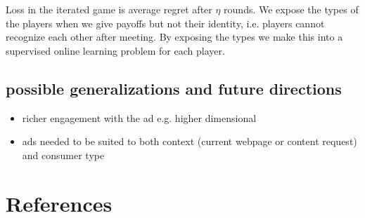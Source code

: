 \documentclass{article}
\begin{document}
Loss in the iterated game is average regret after $\eta$ rounds. We expose the types of the players when we give payoffs but not their identity, i.e. players cannot recognize each other after meeting. By exposing the types we make this into a supervised online learning problem for each player.

\subsection{possible generalizations and future directions}

\begin{itemize}
	\item richer engagement with the ad e.g. higher dimensional
	\item ads needed to be suited to both context (current webpage or content request) and consumer type
\end{itemize}

\section{References}



\end{document}
